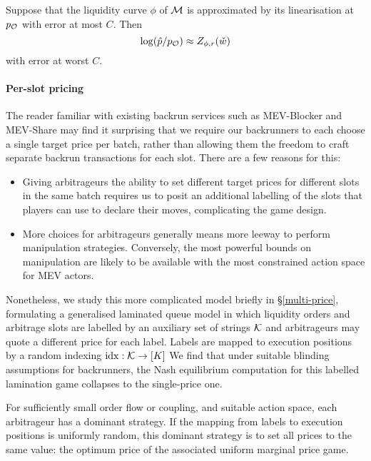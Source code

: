 \begin{theorem}

  Suppose that the liquidity curve $\phi$ of $\mathcal{M}$ is approximated by its linearisation at $p_{\mathcal{O}}$ with error at most $C$.
  Then
  \[
    \log(\hat p/p_{\mathcal{O}}) \approx Z_{\phi,r}(\check w)
  \]
  with error at worst $C$.

\end{theorem}

\paragraph{Per-slot pricing}
%
The reader familiar with existing backrun services such as MEV-Blocker and MEV-Share may find it surprising that we require our backrunners to each choose a single target price per batch, rather than allowing them the freedom to craft separate backrun transactions for each slot.
%
There are a few reasons for this:
%
\begin{itemize}
  \item 
    Giving arbitrageurs the ability to set different target prices for different slots in the same batch requires us to posit an additional labelling of the slots that players can use to declare their moves, complicating the game design.
  \item
    More choices for arbitrageurs generally means more leeway to perform manipulation strategies.
    Conversely, the most powerful bounds on manipulation are likely to be available with the most constrained action space for MEV actors.
\end{itemize}

Nonetheless, we study this more complicated model briefly in \S\ref{multi-price}, formulating a generalised laminated queue model in which liquidity orders and arbitrage slots are labelled by an auxiliary set of strings $\mathcal{K}$ and arbitrageurs may quote a different price for each label.
%
Labels are mapped to execution positions by a random indexing $\mathrm{idx}:\mathcal{K}\rightarrow[K]$
%
We find that under suitable blinding assumptions for backrunners, the Nash equilibrium computation for this labelled lamination game collapses to the single-price one.

\begin{theorem}[\ref{theorem-multi}]

  For sufficiently small order flow or coupling, and suitable action space, each arbitrageur has a dominant strategy.
  If the mapping from labels to execution positions is uniformly random, this dominant strategy is to set all prices to the same value: the optimum price of the associated uniform marginal price game.

\end{theorem}


